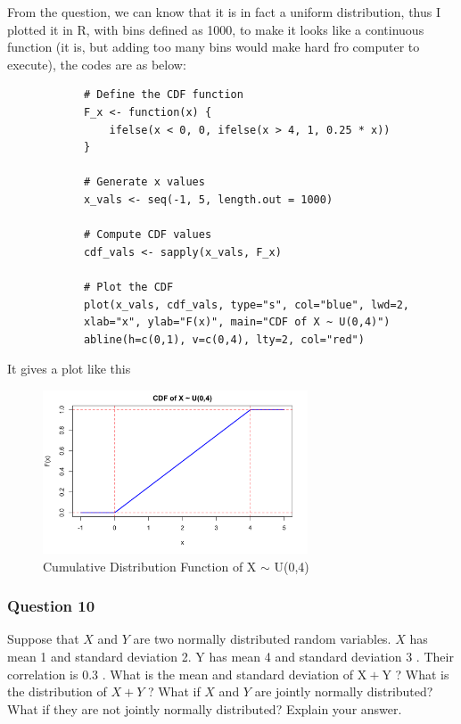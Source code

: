 \documentclass[margin=1in]{article}
\begin{document}
		   From the question, we can know that it is in fact a uniform distribution, thus I plotted it in R, with bins defined as 1000, to make it looks like a continuous function (it is, but adding too many bins would make hard fro computer to execute), the codes are as below:
		   

		   \begin{lstlisting}
		   	# Define the CDF function
		   	F_x <- function(x) {
		   		ifelse(x < 0, 0, ifelse(x > 4, 1, 0.25 * x))
		   	}
		   	
		   	# Generate x values
		   	x_vals <- seq(-1, 5, length.out = 1000)
		   	
		   	# Compute CDF values
		   	cdf_vals <- sapply(x_vals, F_x)
		   	
		   	# Plot the CDF
		   	plot(x_vals, cdf_vals, type="s", col="blue", lwd=2,
		   	xlab="x", ylab="F(x)", main="CDF of X ~ U(0,4)")
		   	abline(h=c(0,1), v=c(0,4), lty=2, col="red")
		   \end{lstlisting}
		   
		   It gives a plot like this
		   
		   \begin{figure}[h]
		   	\caption{Cumulative Distribution Function of  X $\sim$ U(0,4)}
		   	\centering
		   	\includegraphics[width=0.7\textwidth]{HW1_Q9}
		   \end{figure}
	   
		   \pagebreak
		   
		   \subsubsection*{Question 10}
		   Suppose that $X$ and $Y$ are two normally distributed random variables. $X$ has mean 1 and standard deviation 2. Y has mean 4 and standard deviation 3 . Their correlation is 0.3 . What is the mean and standard deviation of $\mathrm{X}+\mathrm{Y}$ ? What is the distribution of $X+Y$ ? What if $X$ and $Y$ are jointly normally distributed? What if they are not jointly normally distributed? Explain your answer.
		   
\end{document}
